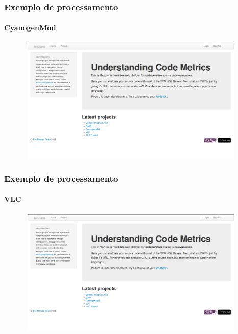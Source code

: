 \documentclass{beamer}
\begin{document}
        \begin{frame}
      \frametitle{Exemplo de processamento}
      \framesubtitle{CyanogenMod}
      
      \begin{figure}
        \begin{center}
          \includegraphics[width=11cm, height=6cm]{images/main.png}
          \label{fig:home}
        \end{center}
      \end{figure}
    
    \end{frame}
    
     \begin{frame}
      \frametitle{Exemplo de processamento}
      \framesubtitle{VLC}
      
      \begin{figure}
        \begin{center}
          \includegraphics[width=11cm, height=6cm]{images/main.png}
          \label{fig:home}
        \end{center}
      \end{figure}
    
    \end{frame}
\end{document}
